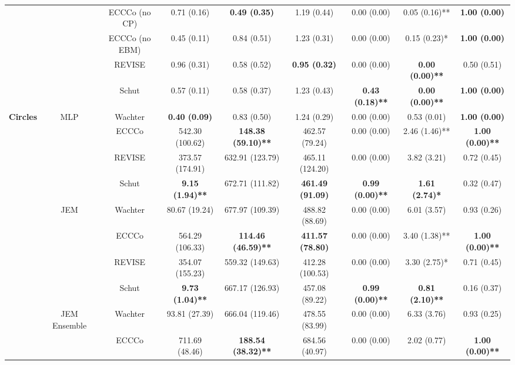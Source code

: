 \begin{table}
{\begin{tabular}[t]{>{}c|c|c|c|c|c|c|c|c}
 &  & ECCCo (no CP) & 0.71 (0.16) & \textbf{0.49 (0.35)} & 1.19 (0.44) & 0.00 (0.00) & 0.05 (0.16)** & \textbf{1.00 (0.00)}\\

 &  & ECCCo (no EBM) & 0.45 (0.11) & 0.84 (0.51) & 1.23 (0.31) & 0.00 (0.00) & 0.15 (0.23)* & \textbf{1.00 (0.00)}\\

 &  & REVISE & 0.96 (0.31) & 0.58 (0.52) & \textbf{0.95 (0.32)} & 0.00 (0.00) & \textbf{0.00 (0.00)**} & 0.50 (0.51)\\

 &  & Schut & 0.57 (0.11) & 0.58 (0.37) & 1.23 (0.43) & \textbf{0.43 (0.18)**} & \textbf{0.00 (0.00)**} & \textbf{1.00 (0.00)}\\

\multirow{-12}{*}{\centering\arraybackslash \textbf{Circles}} & \multirow{-6}{*}{\centering\arraybackslash MLP} & Wachter & \textbf{0.40 (0.09)} & 0.83 (0.50) & 1.24 (0.29) & 0.00 (0.00) & 0.53 (0.01) & \textbf{1.00 (0.00)}\\
\cline{1-9}
 &  & ECCCo & 542.30 (100.62) & \textbf{148.38 (59.10)**} & 462.57 (79.24) & 0.00 (0.00) & 2.46 (1.46)** & \textbf{1.00 (0.00)**}\\

 &  & REVISE & 373.57 (174.91) & 632.91 (123.79) & 465.11 (124.20) & 0.00 (0.00) & 3.82 (3.21) & 0.72 (0.45)\\

 &  & Schut & \textbf{9.15 (1.94)**} & 672.71 (111.82) & \textbf{461.49 (91.09)} & \textbf{0.99 (0.00)**} & \textbf{1.61 (2.74)*} & 0.32 (0.47)\\

 & \multirow{-4}{*}{\centering\arraybackslash JEM} & Wachter & 80.67 (19.24) & 677.97 (109.39) & 488.82 (88.69) & 0.00 (0.00) & 6.01 (3.57) & 0.93 (0.26)\\
\cline{2-9}
 &  & ECCCo & 564.29 (106.33) & \textbf{114.46 (46.59)**} & \textbf{411.57 (78.80)} & 0.00 (0.00) & 3.40 (1.38)** & \textbf{1.00 (0.00)**}\\

 &  & REVISE & 354.07 (155.23) & 559.32 (149.63) & 412.28 (100.53) & 0.00 (0.00) & 3.30 (2.75)* & 0.71 (0.45)\\

 &  & Schut & \textbf{9.73 (1.04)**} & 667.17 (126.93) & 457.08 (89.22) & \textbf{0.99 (0.00)**} & \textbf{0.81 (2.10)**} & 0.16 (0.37)\\

 & \multirow{-4}{*}{\centering\arraybackslash JEM Ensemble} & Wachter & 93.81 (27.39) & 666.04 (119.46) & 478.55 (83.99) & 0.00 (0.00) & 6.33 (3.76) & 0.93 (0.25)\\
\cline{2-9}
 &  & ECCCo & 711.69 (48.46) & \textbf{188.54 (38.32)**} & 684.56 (40.97) & 0.00 (0.00) & 2.02 (0.77) & \textbf{1.00 (0.00)**}\\


\end{tabular}}
\end{table}
